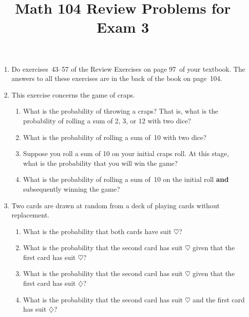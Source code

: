 \documentclass[12pt]{article}
\author{}\date{}
\title{Math 104 Review Problems for Exam 3}\author{}
\begin{document}
\maketitle
\pagestyle{empty}
\begin{enumerate}
\item Do exercises~43--57 of the Review Exercises
on page 97~of your textbook.
The answers to all these exercises are in the
back of the book on page~104.

\item This exercise concerns the game of craps.
\begin{enumerate}
\item What is the probability of throwing a craps? That is, what is
the probability of rolling a sum of 2, 3, or 12 with two dice?
\item What is the probability of rolling a sum of~10 with two dice?
\item Suppose you roll a sum of 10 on your initial craps roll.
At this stage, what is the probability that you will win the game?
\item What is the probability of rolling a sum of~10 on the initial
roll {\bf and} subsequently winning the game?
\end{enumerate}

\item
Two cards are drawn at random from a deck of playing cards
without replacement.
\begin{enumerate}
\item What is the probability that both cards have suit
$\heartsuit$?
\item What is the probability that the second card has
suit $\heartsuit$
given that the first card has suit $\heartsuit$?
\item What is the probability that the second card has
suit $\heartsuit$
given that the first card has suit $\diamondsuit$?
\item What is the probability that the second card has
suit $\heartsuit$
and the first card has suit $\diamondsuit$?
\end{enumerate}


\end{enumerate}
\end{document}
